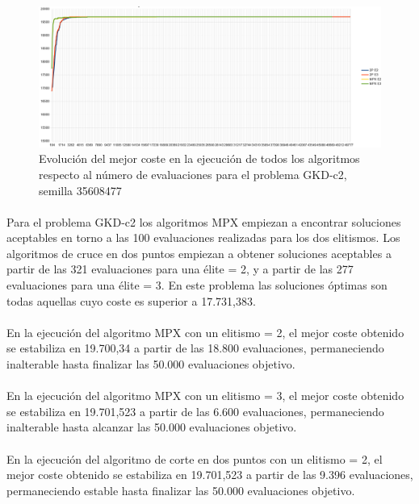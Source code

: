 	\begin{figure}[H]
		\centering
		\includegraphics[scale=0.3]{img/35608477_GKD-c_2_n500_m50.png}
		\caption{Evolución del mejor coste en la ejecución de todos los algoritmos respecto al número de evaluaciones para el problema GKD-c2, semilla 35608477}
		\label{gkd-c2_historico}
	\end{figure}

	\paragraph{}Para el problema GKD-c2 los algoritmos MPX empiezan a encontrar soluciones aceptables en torno a las 100 evaluaciones realizadas para los dos elitismos. Los algoritmos de cruce en dos puntos empiezan a obtener soluciones aceptables a partir de las 321 evaluaciones para una élite = 2, y a partir de las 277 evaluaciones para una élite = 3. En este problema las soluciones óptimas son todas aquellas cuyo coste es superior a 17.731,383.
	
	\paragraph{}En la ejecución del algoritmo MPX con un elitismo = 2, el mejor coste obtenido se estabiliza en 19.700,34 a partir de las 18.800 evaluaciones, permaneciendo inalterable hasta finalizar las 50.000 evaluaciones objetivo.
	
	\paragraph{}En la ejecución del algoritmo MPX con un elitismo = 3, el mejor coste obtenido se estabiliza en 19.701,523 a partir de las 6.600 evaluaciones, permaneciendo inalterable hasta alcanzar las 50.000 evaluaciones objetivo.
	
	\paragraph{}En la ejecución del algoritmo de corte en dos puntos con un elitismo = 2, el mejor coste obtenido se estabiliza en 19.701,523 a partir de las 9.396 evaluaciones, permaneciendo estable hasta finalizar las 50.000 evaluaciones objetivo.
	

